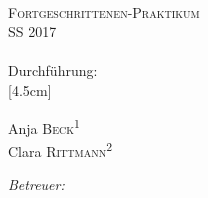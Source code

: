 \begin{titlepage}
	\par
	\hfill
	\par
\begin{center}
\ \\
[5.5cm]	
	\textsc{\Huge Fortgeschrittenen-Praktikum} \\
[0.5cm]
	{\Huge SS 2017} \\
[1.5cm]
	\Huge\textbf{\Versuch} \\
[1cm]
	{\large Durchführung: \Tag} \\
[4.5cm]
\begin{minipage}{0.4\textwidth}
	\begin{flushleft} \large
		Anja \textsc{Beck}\textsuperscript{1} \\
		Clara \textsc{Rittmann}\textsuperscript{2}
	\end{flushleft}
\end{minipage}
\hfill
\begin{minipage}{0.4\textwidth}
	\begin{flushright} \large
		\emph{Betreuer:} \\
		\Betreuer
	\end{flushright}
\end{minipage}
\end{center}
\end{titlepage}